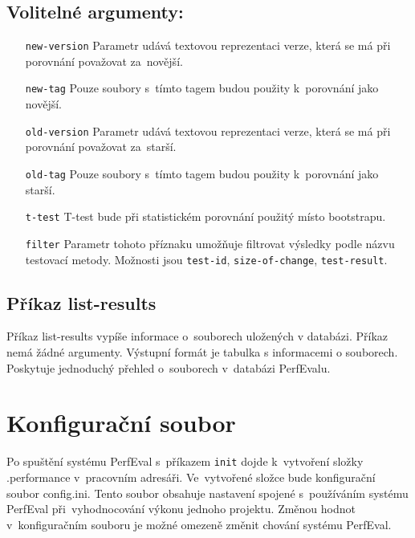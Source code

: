 \subsection*{Volitelné argumenty:}
\begin{itemize}[label=\texttt{\textbf{\textendash}}]
    \item[\texttt{new-version}] Parametr udává textovou reprezentaci verze, která se má při porovnání považovat za~novější.
    \item[\texttt{new-tag}]     Pouze soubory s~tímto tagem budou použity k~porovnání jako novější.
    \item[\texttt{old-version}] Parametr udává textovou reprezentaci verze, která se má při porovnání považovat za~starší.
    \item[\texttt{old-tag}]     Pouze soubory s~tímto tagem budou použity k~porovnání jako starší.
    \item[\texttt{t-test}]      T-test bude při statistickém porovnání použitý místo bootstrapu.
    \item[\texttt{filter}]      Parametr tohoto příznaku umožňuje filtrovat výsledky podle názvu testovací metody.
                                Možnosti jsou \texttt{test-id}, \texttt{size-of-change}, \texttt{test-result}.
\end{itemize}

\subsection{Příkaz list-results}

Příkaz list-results vypíše informace o~souborech uložených v databázi. Příkaz nemá
žádné argumenty. Výstupní formát je tabulka s informacemi o souborech. Poskytuje jednoduchý
přehled o~souborech v~databázi PerfEvalu.

\section{Konfigurační soubor}

Po spuštění systému PerfEval s~příkazem \texttt{init} dojde k~vytvoření složky .performance
v~pracovním adresáři. Ve~vytvořené složce bude konfigurační soubor config.ini.
Tento soubor obsahuje nastavení spojené s~používáním systému PerfEval při~vyhodnocování
výkonu jednoho projektu. Změnou hodnot v~konfiguračním souboru je možné omezeně změnit chování
systému PerfEval.


